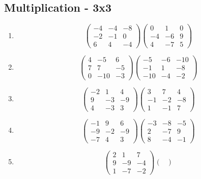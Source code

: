 \documentclass{article}%
\begin{document}
\subsection{Multiplication {-} 3x3}%
\begin{enumerate}[label=\arabic*),start=16]%
\item%
\[%
\begin{pmatrix}%
-4&-4&-8\\%
-2&-1&0\\%
6&4&-4%
\end{pmatrix} \begin{pmatrix}%
0&1&0\\%
-4&-6&9\\%
4&-7&5%
\end{pmatrix}%
\]%
\item%
\[%
\begin{pmatrix}%
4&-5&6\\%
7&7&-5\\%
0&-10&-3%
\end{pmatrix} \begin{pmatrix}%
-5&-6&-10\\%
-1&1&-8\\%
-10&-4&-2%
\end{pmatrix}%
\]%
\item%
\[%
\begin{pmatrix}%
-2&1&4\\%
9&-3&-9\\%
4&-3&3%
\end{pmatrix} \begin{pmatrix}%
3&7&4\\%
-1&-2&-8\\%
1&-1&7%
\end{pmatrix}%
\]%
\item%
\[%
\begin{pmatrix}%
-1&9&6\\%
-9&-2&-9\\%
-7&4&3%
\end{pmatrix} \begin{pmatrix}%
-3&-8&-5\\%
2&-7&9\\%
8&-4&-1%
\end{pmatrix}%
\]%
\item%
\[%
\begin{pmatrix}%
2&1&7\\%
9&-9&-4\\%
1&-7&-2%
\end{pmatrix} \begin{pmatrix}%

\end{pmatrix}\]
\end{enumerate}
\end{document}

